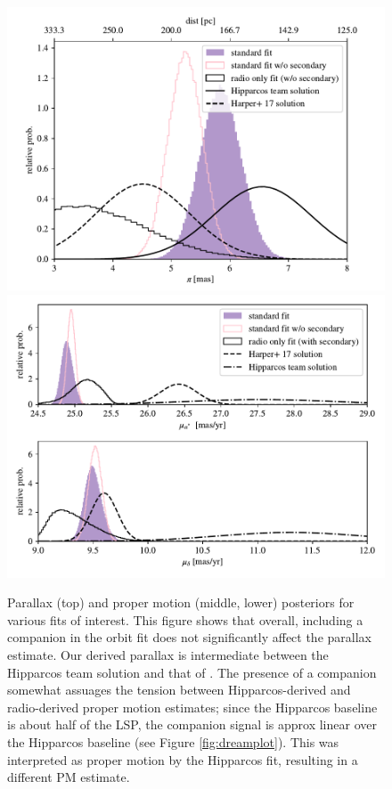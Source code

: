\documentclass[twocolumn]{aastex631}
\begin{document}
\begin{figure}
    \centering
    \includegraphics[width=\linewidth, trim = {0.75cm 0 0.75cm 0}]{figures/plx_compare.pdf}
    \includegraphics[width=\linewidth]{figures/pm_compare.pdf}
    \caption{Parallax (top) and proper motion (middle, lower) posteriors for various fits of interest. This figure shows that overall, including a companion in the orbit fit does not significantly affect the parallax estimate. Our derived parallax is intermediate between the Hipparcos team solution and that of \citet{2017AJ....154...11H}. The presence of a companion somewhat assuages the tension between Hipparcos-derived and radio-derived proper motion estimates; since the Hipparcos baseline is about half of the LSP, the companion signal is approx linear over the Hipparcos baseline (see Figure \ref{fig:dreamplot}). This was interpreted as proper motion by the Hipparcos fit, resulting in a different PM estimate. }
    \label{fig:plx-comp}
\end{figure}
\end{document}

